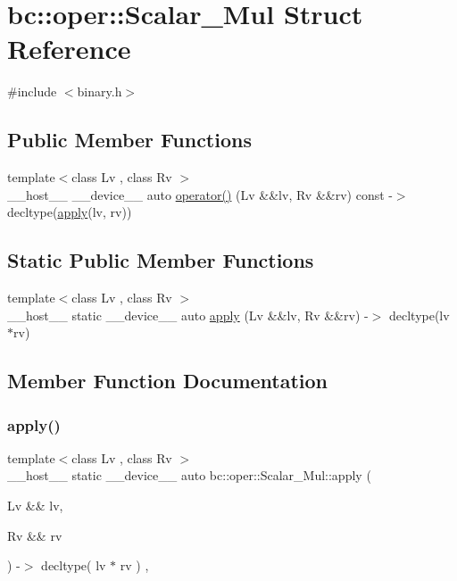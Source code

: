 \hypertarget{structbc_1_1oper_1_1Scalar__Mul}{}\section{bc\+:\+:oper\+:\+:Scalar\+\_\+\+Mul Struct Reference}
\label{structbc_1_1oper_1_1Scalar__Mul}


{\ttfamily \#include $<$binary.\+h$>$}

\subsection*{Public Member Functions}
\begin{DoxyCompactItemize}
\item 
{\footnotesize template$<$class Lv , class Rv $>$ }\\\+\_\+\+\_\+host\+\_\+\+\_\+ \+\_\+\+\_\+device\+\_\+\+\_\+ auto \hyperlink{structbc_1_1oper_1_1Scalar__Mul_a327fe310e3961fbebc4309a96d38f3d0}{operator()} (Lv \&\&lv, Rv \&\&rv) const -\/$>$ decltype(\hyperlink{structbc_1_1oper_1_1Scalar__Mul_a40d224204c48aaf6ea6392108915879b}{apply}(lv, rv))
\end{DoxyCompactItemize}
\subsection*{Static Public Member Functions}
\begin{DoxyCompactItemize}
\item 
{\footnotesize template$<$class Lv , class Rv $>$ }\\\+\_\+\+\_\+host\+\_\+\+\_\+ static \+\_\+\+\_\+device\+\_\+\+\_\+ auto \hyperlink{structbc_1_1oper_1_1Scalar__Mul_a40d224204c48aaf6ea6392108915879b}{apply} (Lv \&\&lv, Rv \&\&rv) -\/$>$ decltype(lv $\ast$rv)
\end{DoxyCompactItemize}


\subsection{Member Function Documentation}
\mbox{\label{structbc_1_1oper_1_1Scalar__Mul_a40d224204c48aaf6ea6392108915879b}} 
\subsubsection{\texorpdfstring{apply()}{apply()}}
{\footnotesize\ttfamily template$<$class Lv , class Rv $>$ \\
\+\_\+\+\_\+host\+\_\+\+\_\+ static \+\_\+\+\_\+device\+\_\+\+\_\+ auto bc\+::oper\+::\+Scalar\+\_\+\+Mul\+::apply (\begin{DoxyParamCaption}\item[{Lv \&\&}]{lv,  }\item[{Rv \&\&}]{rv }\end{DoxyParamCaption}) -\/$>$ decltype( lv $\ast$ rv ) \hspace{0.3cm}{\ttfamily [inline]}, {\ttfamily [static]}}


